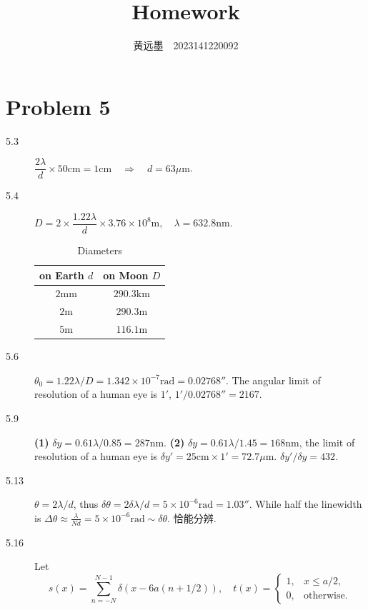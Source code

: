 \documentclass[11pt, twoside]{article}   	%
\title{Homework}
\author{黄远墨~~\textsf{2023141220092}}
\date{}							%
\theoremstyle{plain}
\theoremstyle{definition}
\begin{document}
	\thispagestyle{fancy}
	\section{Problem 5}
	\begin{description}
		\item[5.3] $\dfrac{2\lambda}{d} \times 50 \mathrm{cm} = 1 \mathrm{cm} \quad \Rightarrow
			\quad d = 63 \mu\mathrm{m}$.
		\item[5.4] $D = 2 \times \dfrac{1.22\lambda}{d} \times 3.76 \times 10^{8} \mathrm{m}, \quad
			\lambda = 632.8 \mathrm{nm}$.
			\begin{table}[htbp]
				\caption{Diameters}
				\centering
				\begin{tabular}{cc}
					\toprule
					on Earth $d$ & on Moon $D$\\
					\midrule
					$2 \mathrm{mm}$ & $290.3 \mathrm{km}$\\
					$2 \mathrm{m}$	& $290.3 \mathrm{m}$\\
					$5 \mathrm{m}$	& $116.1 \mathrm{m}$\\
					\bottomrule
				\end{tabular}
			\end{table}
		\item[5.6] $\theta_0 = 1.22 \lambda / D = 1.342 \times 10^{-7} \mathrm{rad} = 0.02768''$.
			The angular limit of resolution of a human eye is $1'$, $1' / 0.02768'' = 2167$.
		\item[5.9] \textbf{(1)} $\delta y = 0.61\lambda / 0.85 = 287 \mathrm{nm}$. \textbf{(2)}
			$\delta y = 0.61 \lambda / 1.45 = 168 \mathrm{nm}$, the limit of resolution of a human
			eye is $\delta y' = 25\mathrm{cm} \times 1' = 72.7\mu\mathrm{m}$. $\delta y' / \delta y
			= 432$.
		\item[5.13] $\theta = 2\lambda / d$, thus $\delta \theta = 2 \delta \lambda / d = 5 \times
			10^{-6} \mathrm{rad} = 1.03''$. While half the linewidth is $\Delta \theta \approx
			\frac{\lambda}{Nd} = 5 \times 10^{-6} \mathrm{rad} \sim \delta \theta$. 恰能分辨.
		\item[5.16] Let
			\begin{equation}
				s(x) = \sum_{n=-N}^{N - 1} \delta(x - 6 a (n + 1/2)), \quad
				t(x) =
				\begin{cases}
					1, & x \leq a/2,\\
					0, & \text{otherwise}.

\end{cases}
\end{equation}
\end{description}
\end{document}

